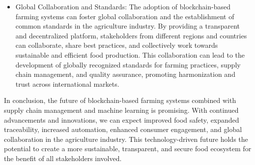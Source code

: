 {\begin{itemize}
    \item Global Collaboration and Standards: The adoption of blockchain-based farming systems can foster global collaboration and the establishment of common standards in the agriculture industry. By providing a transparent and decentralized platform, stakeholders from different regions and countries can collaborate, share best practices, and collectively work towards sustainable and efficient food production. This collaboration can lead to the development of globally recognized standards for farming practices, supply chain management, and quality assurance, promoting harmonization and trust across international markets.
\end{itemize}

In conclusion, the future of blockchain-based farming systems combined with supply chain management and machine learning is promising. With continued advancements and innovations, we can expect improved food safety, expanded traceability, increased automation, enhanced consumer engagement, and global collaboration in the agriculture industry. This technology-driven future holds the potential to create a more sustainable, transparent, and secure food ecosystem for the benefit of all stakeholders involved.
}
